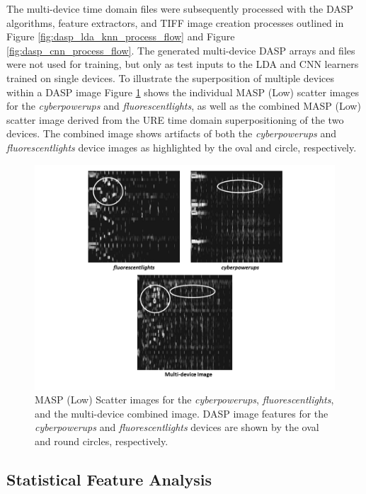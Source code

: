 The multi-device time domain files were subsequently processed with the DASP algorithms, feature extractors, and TIFF image creation processes outlined in Figure \ref{fig:dasp_lda_knn_process_flow} and Figure \ref{fig:dasp_cnn_process_flow}.  The generated multi-device DASP arrays and files were not used for training, but only as test inputs to the LDA and CNN learners trained on single devices.  To illustrate the superposition of multiple devices within a DASP image Figure \ref{fig:multi_device_image} shows the individual MASP (Low) scatter images for the \textit{cyberpowerups} and \textit{fluorescentlights}, as well as the combined MASP (Low) scatter image derived from the URE time domain superpositioning of the two devices.  The combined image shows artifacts of both the \textit{cyberpowerups} and \textit{fluorescentlights} device images as highlighted by the oval and circle, respectively.   

\begin{figure}[htbp!]
	\includegraphics[width=\textwidth,height=\textheight,keepaspectratio]{./misc_graphics/multiDeivceImages.png}
	\centering
	\caption{MASP (Low) Scatter images for the \textit{cyberpowerups}, \textit{fluorescentlights}, and the multi-device combined image.  DASP image features for the \textit{cyberpowerups} and \textit{fluorescentlights} devices are shown by the oval and round circles, respectively.}
	\label{fig:multi_device_image}
\end{figure}

\subsection[Statistical Feature Analysis]{Statistical Feature Analysis}
\label{Statistical Features Multiple Device Classification}

